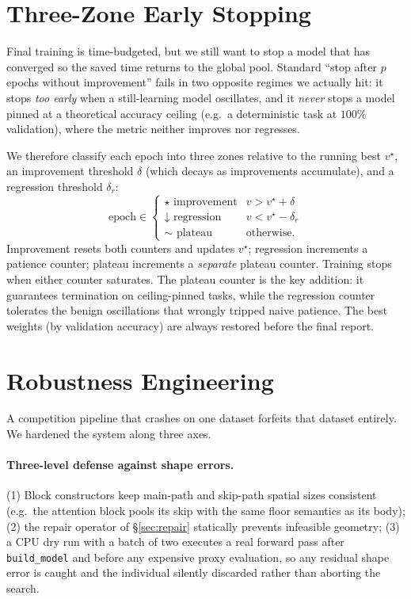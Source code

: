 \documentclass[10pt,twocolumn]{article}
\newcommand{\code}[1]{\texttt{\small #1}}
\begin{document}
\section{Three-Zone Early Stopping}
\label{sec:es}

Final training is time-budgeted, but we still want to stop a model that has
converged so the saved time returns to the global pool. Standard
``stop after $p$ epochs without improvement'' fails in two opposite regimes we
actually hit: it stops \emph{too early} when a still-learning model oscillates,
and it \emph{never} stops a model pinned at a theoretical accuracy ceiling
(e.g.\ a deterministic task at $100\%$ validation), where the metric neither
improves nor regresses.

We therefore classify each epoch into three zones relative to the running best
$v^\star$, an improvement threshold $\delta$ (which decays as improvements
accumulate), and a regression threshold $\delta_r$:
\[
\text{epoch} \in
\begin{cases}
\text{$\star$\ improvement} & v > v^\star + \delta\\
\text{$\downarrow$ regression} & v < v^\star - \delta_r\\
\text{$\sim$ plateau} & \text{otherwise.}
\end{cases}
\]
Improvement resets both counters and updates $v^\star$; regression increments a
patience counter; plateau increments a \emph{separate} plateau counter.
Training stops when either counter saturates. The plateau counter is the key
addition: it guarantees termination on ceiling-pinned tasks, while the
regression counter tolerates the benign oscillations that wrongly tripped
naive patience. The best weights (by validation accuracy) are always restored
before the final report.

\section{Robustness Engineering}
\label{sec:defense}

A competition pipeline that crashes on one dataset forfeits that dataset
entirely. We hardened the system along three axes.

\paragraph{Three-level defense against shape errors.}
(1) Block constructors keep main-path and skip-path spatial sizes consistent
(e.g.\ the attention block pools its skip with the same floor semantics as its
body); (2) the repair operator of \S\ref{sec:repair} statically prevents
infeasible geometry; (3) a CPU dry run with a batch of two executes a real
forward pass after \code{build\_model} and before any expensive proxy
evaluation, so any residual shape error is caught and the individual silently
discarded rather than aborting the search.
\end{document}
